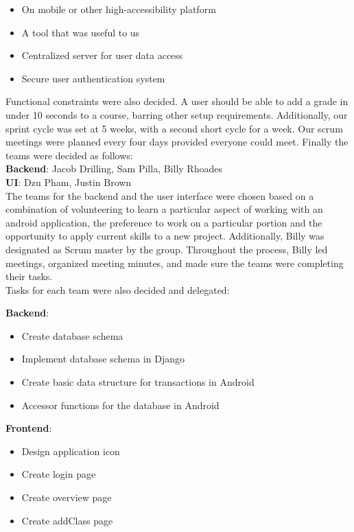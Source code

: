 \documentclass[a4paper]{article} %
\begin{document}
\begin{itemize}
  \item On mobile or other high-accessibility platform
    \item A tool that was useful to us
    \item Centralized server for user data access
    \item Secure user authentication system
\end{itemize}

Functional constraints were also decided. A user should be able to add a grade in under 10 seconds to a course, barring other setup requirements. Additionally, our sprint cycle was set at 5 weeks, with a second short cycle for a week. Our scrum meetings were planned every four days provided everyone could meet. Finally the teams were decided as follows: \\
 
\textbf{Backend}:  Jacob Drilling, Sam Pilla, Billy Rhoades\\
\textbf{UI}:  Dzu Pham, Justin Brown \\

The teams for the backend and the user interface were chosen based on a combination of volunteering to learn a particular aspect of working with an android application, the preference to work on a particular portion and the opportunity to apply current skills to a new project. Additionally, Billy was designated as Scrum master by the group. Throughout the process, Billy led meetings, organized meeting minutes, and made sure the teams were completing their tasks.
\\

Tasks for each team were also decided and delegated:

\textbf{Backend}:
\begin{itemize}
  \item Create database schema
    \item Implement database schema in Django
    \item Create basic data structure for transactions in Android
    \item Accessor functions for the database in Android
%
% 
%
%
% 
%
\end{itemize}

\textbf{Frontend}:
\begin{itemize}
  \item Design application icon
  \item Create login page
    \item Create overview page
    \item Create addClass page
\end{itemize}
\end{document}
